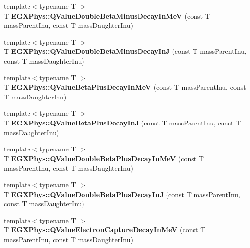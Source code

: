 \begin{DoxyCompactItemize}
\item 
\mbox{\label{_q_value_8hpp_a2678563115405a056c6bdccc9f2a9232}} 
{\footnotesize template$<$typename T $>$ }\\T {\bfseries E\+G\+X\+Phys\+::\+Q\+Value\+Double\+Beta\+Minus\+Decay\+In\+MeV} (const T mass\+Parent\+Inu, const T mass\+Daughter\+Inu)
\item 
\mbox{\label{_q_value_8hpp_a5be6923812a1a701ed38965329dd6297}} 
{\footnotesize template$<$typename T $>$ }\\T {\bfseries E\+G\+X\+Phys\+::\+Q\+Value\+Double\+Beta\+Minus\+Decay\+InJ} (const T mass\+Parent\+Inu, const T mass\+Daughter\+Inu)
\item 
\mbox{\label{_q_value_8hpp_a3c4f7ec8e7c44d01d3aee6447a5ab443}} 
{\footnotesize template$<$typename T $>$ }\\T {\bfseries E\+G\+X\+Phys\+::\+Q\+Value\+Beta\+Plus\+Decay\+In\+MeV} (const T mass\+Parent\+Inu, const T mass\+Daughter\+Inu)
\item 
\mbox{\label{_q_value_8hpp_aaee51753f077c9fe05188aa5b24f642e}} 
{\footnotesize template$<$typename T $>$ }\\T {\bfseries E\+G\+X\+Phys\+::\+Q\+Value\+Beta\+Plus\+Decay\+InJ} (const T mass\+Parent\+Inu, const T mass\+Daughter\+Inu)
\item 
\mbox{\label{_q_value_8hpp_ab78be314eac63ddbce441b4c8b22b47d}} 
{\footnotesize template$<$typename T $>$ }\\T {\bfseries E\+G\+X\+Phys\+::\+Q\+Value\+Double\+Beta\+Plus\+Decay\+In\+MeV} (const T mass\+Parent\+Inu, const T mass\+Daughter\+Inu)
\item 
\mbox{\label{_q_value_8hpp_a3531ffda0c561a601a61f54f5c7780df}} 
{\footnotesize template$<$typename T $>$ }\\T {\bfseries E\+G\+X\+Phys\+::\+Q\+Value\+Double\+Beta\+Plus\+Decay\+InJ} (const T mass\+Parent\+Inu, const T mass\+Daughter\+Inu)
\item 
\mbox{\label{_q_value_8hpp_aa02fb5143735f3be09f7b9552c1d6a81}} 
{\footnotesize template$<$typename T $>$ }\\T {\bfseries E\+G\+X\+Phys\+::\+Q\+Value\+Electron\+Capture\+Decay\+In\+MeV} (const T mass\+Parent\+Inu, const T mass\+Daughter\+Inu)

\end{DoxyCompactItemize}
